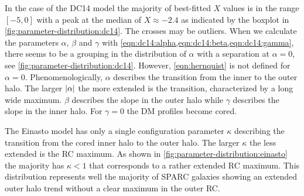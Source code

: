 In the case of the DC14 model the majority of best-fitted $X$ values is in the range $[-5, 0]$ with a peak at the median of $X \approx -2.4$ as indicated by the boxplot in \cref{fig:parameter-distribution:dc14}. The crosses may be outliers. When we calculate the parameters $\alpha$, $\beta$ and $\gamma$ with \cref{eqn:dc14:alpha,eqn:dc14:beta,eqn:dc14:gamma}, there seems to be a grouping in the distribution of $\alpha$ with a separation at $\alpha = 0$, see \cref{fig:parameter-distribution:dc14}. However, \cref{eqn:hernquist} is not defined for $\alpha = 0$. Phenomenologically, $\alpha$ describes the transition from the inner to the outer halo. The larger $\left|\alpha\right|$ the more extended is the transition, characterized by a long wide maximum. $\beta$ describes the slope in the outer halo while $\gamma$ describes the slope in the inner halo. For $\gamma = 0$ the DM profiles become cored.

The Einasto model has only a single configuration parameter $\kappa$ describing the transition from the cored inner halo to the outer halo. The larger $\kappa$ the less extended is the RC maximum. As shown in \cref{fig:parameter-distribution:einasto} the majority has $\kappa < 1$ that corresponds to a rather extended RC maximum. This distribution represents well the majority of SPARC galaxies showing an extended outer halo trend without a clear maximum in the outer RC.
